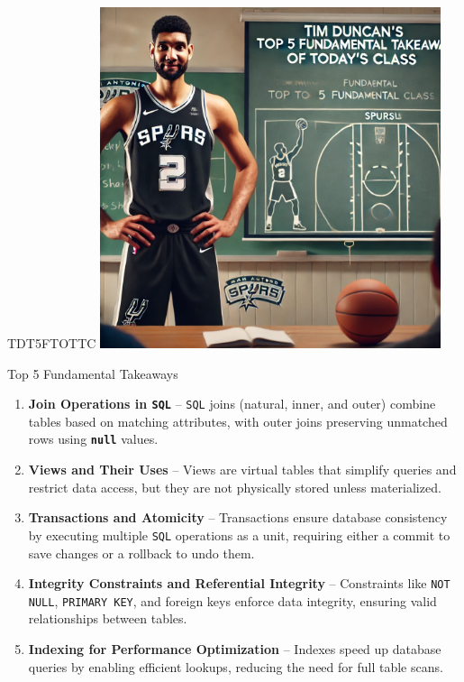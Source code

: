 \documentclass{beamer}
\begin{document}
\begin{frame}{TDT5FTOTTC}
    \centering
    \includegraphics[width=0.75\textwidth]{figures/tim.png}
\end{frame}

\begin{frame}{Top 5 Fundamental Takeaways}
    \small
    \begin{enumerate}
        \item[5] \textbf{Join Operations in \texttt{SQL}} – \texttt{SQL} joins (natural, inner, and outer) combine tables based on matching attributes, with outer joins preserving unmatched rows using \texttt{\textbf{null}} values.
        \pause
        \item[4] \textbf{Views and Their Uses} – Views are virtual tables that simplify queries and restrict data access, but they are not physically stored unless materialized.
        \pause
        \item[3] \textbf{Transactions and Atomicity} – Transactions ensure database consistency by executing multiple \texttt{SQL} operations as a unit, requiring either a commit to save changes or a rollback to undo them.
        \pause
        \item[2] \textbf{Integrity Constraints and Referential Integrity} – Constraints like \texttt{NOT NULL}, \texttt{PRIMARY KEY}, and foreign keys enforce data integrity, ensuring valid relationships between tables.
        \pause
        \item[1] \textbf{Indexing for Performance Optimization} – Indexes speed up database queries by enabling efficient lookups, reducing the need for full table scans.
    \end{enumerate}
\end{frame}
\end{document}
